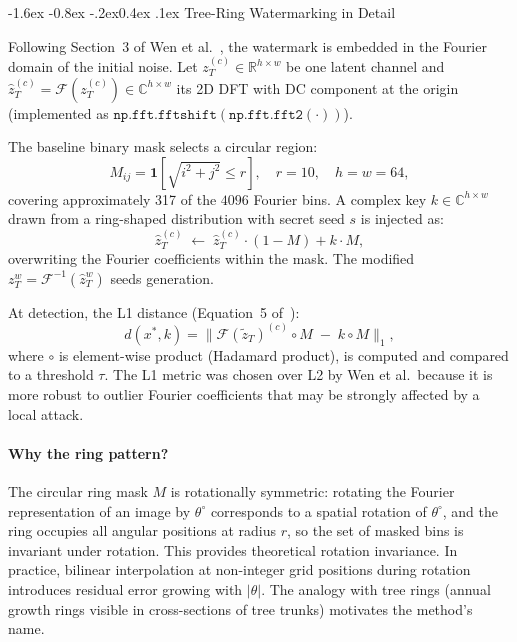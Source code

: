 \documentclass[10pt,twocolumn]{article}
\makeatletter
\renewcommand\subsection{\@startsection{subsection}{2}{\z@}%
  {-1.6ex \@plus -0.8ex \@minus -.2ex}{0.4ex \@plus .1ex}%
  {\normalfont\normalsize\itshape}}
\makeatother
\begin{document}
\subsection{Tree-Ring Watermarking in Detail}

Following Section~3 of Wen et al.~\cite{wen2023treering}, the
watermark is embedded in the Fourier domain of the initial noise.
Let $z_T^{(c)} \in \mathbb{R}^{h \times w}$ be one latent channel
and $\hat{z}_T^{(c)} = \mathcal{F}(z_T^{(c)}) \in \mathbb{C}^{h \times w}$
its 2D DFT with DC component at the origin
(implemented as $\texttt{np.fft.fftshift}(\texttt{np.fft.fft2}(\cdot))$).

The baseline binary mask selects a circular region:
\begin{equation}
  M_{ij} = \mathbf{1}\!\left[\sqrt{i^2+j^2} \le r\right],
  \quad r{=}10, \quad h{=}w{=}64,
  \label{eq:mask_baseline}
\end{equation}
covering approximately 317 of the $4096$ Fourier bins.
A complex key $k \in \mathbb{C}^{h \times w}$ drawn from a
ring-shaped distribution with secret seed $s$ is injected as:
\begin{equation}
  \hat{z}_T^{(c)} \;\leftarrow\;
    \hat{z}_T^{(c)} \cdot (1 - M) + k \cdot M,
  \label{eq:inject}
\end{equation}
overwriting the Fourier coefficients within the mask.
The modified $z_T^w = \mathcal{F}^{-1}(\hat{z}_T^w)$ seeds generation.

At detection, the L1 distance (Equation~5 of~\cite{wen2023treering}):
\begin{equation}
  d(x^*, k) =
    \bigl\|\mathcal{F}(\tilde{z}_T)^{(c)} \circ M
    \;-\; k \circ M\bigr\|_1,
  \label{eq:l1}
\end{equation}
where $\circ$ is element-wise product (Hadamard product),
is computed and compared to a threshold $\tau$.
The L1 metric was chosen over L2 by Wen et al.\ because it is
more robust to outlier Fourier coefficients that may be strongly
affected by a local attack.

\paragraph{Why the ring pattern?}
The circular ring mask $M$ is rotationally symmetric: rotating the
Fourier representation of an image by $\theta^\circ$ corresponds
to a spatial rotation of $\theta^\circ$, and the ring occupies all
angular positions at radius $r$, so the set of masked bins is invariant
under rotation.
This provides theoretical rotation invariance.
In practice, bilinear interpolation at non-integer grid positions
during rotation introduces residual error growing with $|\theta|$.
The analogy with tree rings (annual growth rings visible in cross-sections
of tree trunks) motivates the method's name.
\end{document}
